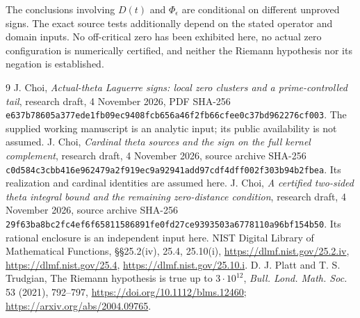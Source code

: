 \documentclass[11pt,a4paper]{article}
\begin{document}
The conclusions involving $D(t)$ and $\Phi_\epsilon$ are conditional on different unproved signs. The exact source tests additionally depend on the stated operator and domain inputs. No off-critical zero has been exhibited here, no actual zero configuration is numerically certified, and neither the Riemann hypothesis nor its negation is established.
\begin{thebibliography}{9}
 J. Choi, \emph{Actual-theta Laguerre signs: local zero clusters and a prime-controlled tail}, research draft, 4 November 2026, PDF SHA-256 \texttt{e637b78605a377ede1fb09ec9408fcb656a46f2fb66cfee0c37bd962276cf003}. The supplied working manuscript is an analytic input; its public availability is not assumed.
 J. Choi, \emph{Cardinal theta sources and the sign on the full kernel complement}, research draft, 4 November 2026, source archive SHA-256 \texttt{c0d584c3cbb416e962479a2f919ec9a92941add97cdf4dff002f303b94b2fbea}. Its realization and cardinal identities are assumed here.
 J. Choi, \emph{A certified two-sided theta integral bound and the remaining zero-distance condition}, research draft, 4 November 2026, source archive SHA-256 \texttt{29f63ba8bc2fc4ef6f65811586891fe0fd27ce9393503a6778110a96bf154b50}. Its rational enclosure is an independent input here.
 NIST Digital Library of Mathematical Functions, §§25.2(iv), 25.4, 25.10(i), \url{https://dlmf.nist.gov/25.2.iv}, \url{https://dlmf.nist.gov/25.4}, \url{https://dlmf.nist.gov/25.10.i}.
 D. J. Platt and T. S. Trudgian, The Riemann hypothesis is true up to $3\cdot10^{12}$, \emph{Bull. Lond. Math. Soc.} 53 (2021), 792--797, \url{https://doi.org/10.1112/blms.12460}; \url{https://arxiv.org/abs/2004.09765}.
\end{thebibliography}
\end{document}
